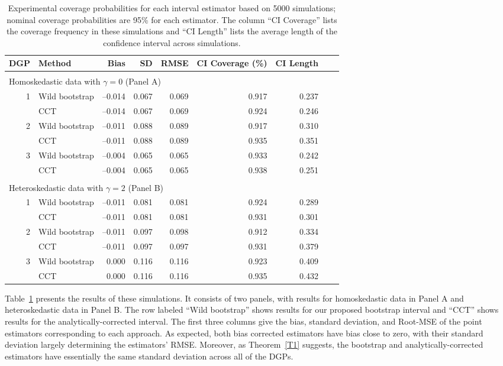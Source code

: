 \documentclass[12pt,fleqn]{article}
\begin{document}
\begin{table}[t]
  \centering
  \begin{tabular}{rlrrrrrrr}
    \toprule
    DGP & Method       & Bias    & SD    & RMSE  & CI Coverage (\%) & CI Length \\
    \midrule                                                     \\
    \multicolumn{7}{l}{Homoskedastic data with $\gamma = 0$ (Panel A)}  \\
    \midrule
    1 & Wild bootstrap & --0.014 & 0.067 & 0.069 & 0.917 & 0.237 \\ 
      & CCT            & --0.014 & 0.067 & 0.069 & 0.924 & 0.246 \\ 
    2 & Wild bootstrap & --0.011 & 0.088 & 0.089 & 0.917 & 0.310 \\ 
      & CCT            & --0.011 & 0.088 & 0.089 & 0.935 & 0.351 \\
    3 & Wild bootstrap & --0.004 & 0.065 & 0.065 & 0.933 & 0.242 \\
      & CCT            & --0.004 & 0.065 & 0.065 & 0.938 & 0.251 \\ 
    \midrule                                                     \\
    \multicolumn{7}{l}{Heteroskedastic data with $\gamma = 2$ (Panel B)}  \\
    \midrule
    1 & Wild bootstrap & --0.011 & 0.081 & 0.081 & 0.924 & 0.289 \\
      & CCT            & --0.011 & 0.081 & 0.081 & 0.931 & 0.301 \\ 
    2 & Wild bootstrap & --0.011 & 0.097 & 0.098 & 0.912 & 0.334 \\ 
      & CCT            & --0.011 & 0.097 & 0.097 & 0.931 & 0.379 \\
    3 & Wild bootstrap &   0.000 & 0.116 & 0.116 & 0.923 & 0.409 \\ 
      & CCT            &   0.000 & 0.116 & 0.116 & 0.935 & 0.432 \\
    \bottomrule
  \end{tabular}
  \caption{%
    Experimental coverage probabilities for each interval estimator based on 5000
    simulations; nominal coverage probabilities are 95\% for each estimator. The column
    ``CI Coverage'' lists the coverage frequency in these simulations and ``CI Length''
    lists the average length of the confidence interval across simulations.}
  \label{tbl:1}
\end{table}

Table~\ref{tbl:1} presents the results of these simulations. It consists of two panels, with results for homoskedastic data in Panel A and heteroskedastic data in Panel B. The row labeled
``Wild bootstrap'' shows results for our proposed bootstrap interval and ``CCT'' shows
results for the analytically-corrected interval. The first three columns give the bias,
standard deviation, and Root-MSE of the point
estimators corresponding to each approach.  As expected, both
bias corrected estimators have
bias close to zero, with their standard deviation largely
determining the estimators' RMSE. Moreover, as Theorem~\ref{T1} suggests, the
bootstrap and analytically-corrected estimators have essentially the same
standard deviation across all of the DGPs.
\end{document}
